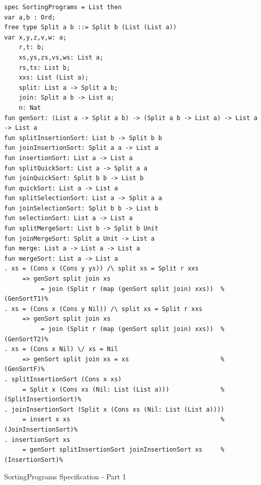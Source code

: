 \documentclass[12pt,twoside]{article}
\numberwithin{spec}{subsection}
\numberwithin{proof}{subsection}
\numberwithin{figure}{subsection}
\numberwithin{code}{subsection}
\begin{document}
\begin{spec}\capstart
\begin{verbatim}
spec SortingPrograms = List then
var a,b : Ord;
free type Split a b ::= Split b (List (List a))
var x,y,z,v,w: a;
    r,t: b;
    xs,ys,zs,vs,ws: List a;
    rs,ts: List b;
    xxs: List (List a);
    split: List a -> Split a b;
    join: Split a b -> List a;
    n: Nat
fun genSort: (List a -> Split a b) -> (Split a b -> List a) -> List a -> List a
fun splitInsertionSort: List b -> Split b b
fun joinInsertionSort: Split a a -> List a
fun insertionSort: List a -> List a
fun splitQuickSort: List a -> Split a a
fun joinQuickSort: Split b b -> List b
fun quickSort: List a -> List a
fun splitSelectionSort: List a -> Split a a
fun joinSelectionSort: Split b b -> List b
fun selectionSort: List a -> List a
fun splitMergeSort: List b -> Split b Unit
fun joinMergeSort: Split a Unit -> List a
fun merge: List a -> List a -> List a
fun mergeSort: List a -> List a
. xs = (Cons x (Cons y ys)) /\ split xs = Split r xxs 
     => genSort split join xs 
          = join (Split r (map (genSort split join) xxs))  %(GenSortT1)%
. xs = (Cons x (Cons y Nil)) /\ split xs = Split r xxs 
     => genSort split join xs 
          = join (Split r (map (genSort split join) xxs))  %(GenSortT2)%
. xs = (Cons x Nil) \/ xs = Nil
     => genSort split join xs = xs                         %(GenSortF)%
. splitInsertionSort (Cons x xs) 
     = Split x (Cons xs (Nil: List (List a)))              %(SplitInsertionSort)%
. joinInsertionSort (Split x (Cons xs (Nil: List (List a)))) 
     = insert x xs                                         %(JoinInsertionSort)%
. insertionSort xs 
     = genSort splitInsertionSort joinInsertionSort xs     %(InsertionSort)%
\end{verbatim}
\caption{SortingPrograms Specification - Part 1}
\end{spec}
\end{document}
